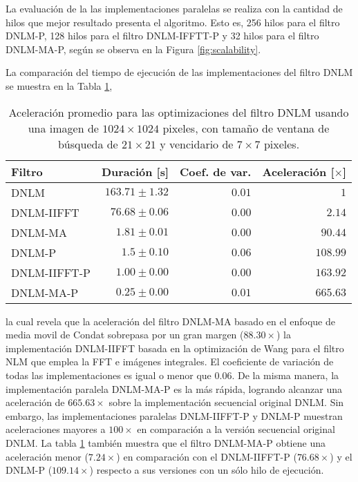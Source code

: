 La evaluaci\'on de la las implementaciones paralelas se realiza con la cantidad de hilos que mejor resultado presenta el algoritmo. Esto es, 256 hilos para el filtro DNLM-P, 128 hilos para el filtro DNLM-IFFTT-P y 32 hilos para el filtro DNLM-MA-P, según se observa en la Figura \ref{fig:scalability}. 


La comparación del tiempo de ejecución de las implementaciones del filtro DNLM se muestra en la Tabla \ref{tabla:speedup},
%
\begin{table}[htb]
\protect\caption[Aceleración promedio de optimizaciones del filtro DNLM]{Aceleración promedio para las optimizaciones del filtro DNLM usando una imagen de  $1024 \times 1024$ pixeles, con tama\~no de ventana de búsqueda de $21 \times 21$ y vencidario de $7 \times 7$ pixeles. \label{tabla:speedup}}
\centering
\begin{tabular}{lrrr}
Filtro & Duración [s]& Coef. de var. & Aceleración [$\times$]\tabularnewline
\hline
DNLM & $163.71\pm1.32$ & $0.01$ & $1$\tabularnewline
DNLM-IIFFT & $76.68\pm0.06$ & $0.00$ & $2.14$\tabularnewline
DNLM-MA & $1.81\pm 0.01$ & $0.00$ & $90.44$ \tabularnewline
DNLM-P & $1.5\pm0.10$ & $0.06$ & $108.99$\tabularnewline
DNLM-IIFFT-P & $1.00\pm0.00$ & $0.00$ & $163.92$ \tabularnewline 
DNLM-MA-P & $\boldsymbol{0.25\pm0.00}$ & $\boldsymbol{0.01}$ &  $\boldsymbol{665.63}$\tabularnewline
\end{tabular}
\end{table}
%
la cual revela que la aceleración del filtro DNLM-MA basado en el enfoque de media movil de Condat \cite{Condat2010} sobrepasa por un gran margen ($88.30\times$) la implementación DNLM-IIFFT \cite{CalderonRamirez2017} basada en la optimización de Wang para el filtro NLM \cite{wang2006fast} que emplea la FFT e imágenes integrales. El coeficiente de variación de todas las implementaciones es igual o menor que $0.06$. 
De la misma manera, la implementación paralela DNLM-MA-P es la más rápida, logrando alcanzar una aceleración de $665.63\times$ sobre la implementación secuencial original DNLM. Sin embargo, las implementaciones paralelas DNLM-IIFFT-P y DNLM-P muestran aceleraciones mayores a $100\times$ en comparación a la versión secuencial original DNLM.
La tabla \ref{tabla:speedup} también muestra que el filtro DNLM-MA-P obtiene una aceleración menor ($7.24\times$) en comparación con el DNLM-IIFFT-P ($76.68\times$) y el DNLM-P ($109.14\times$) respecto a sus versiones con un sólo hilo de ejecución.


